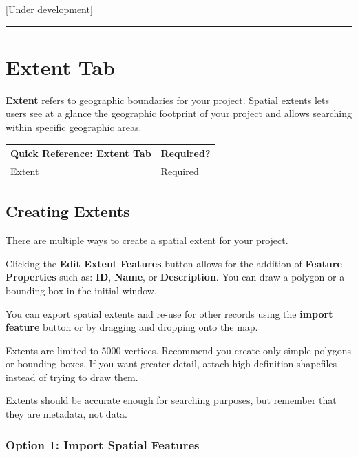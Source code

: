 \documentclass[
]{book}
\begin{document}
{[}Under development{]}

\begin{center}\rule{0.5\linewidth}{\linethickness}\end{center}

\hypertarget{project-extent}{%
\section{Extent Tab}\label{project-extent}}

\textbf{Extent} refers to geographic boundaries for your project. Spatial extents lets users see at a glance the geographic footprint of your project and allows searching within specific geographic areas.

\begin{longtable}[]{@{}ll@{}}
\toprule
Quick Reference: Extent Tab & Required?\tabularnewline
\midrule
\endhead
Extent & Required\tabularnewline
\bottomrule
\end{longtable}

\hypertarget{creating-extents}{%
\subsection{Creating Extents}\label{creating-extents}}

There are multiple ways to create a spatial extent for your project.

Clicking the \textbf{Edit Extent Features} button allows for the addition of \textbf{Feature Properties} such as: \textbf{ID}, \textbf{Name}, or \textbf{Description}. You can draw a polygon or a bounding box in the initial window.

You can export spatial extents and re-use for other records using the \textbf{import feature} button or by dragging and dropping onto the map.

Extents are limited to 5000 vertices. Recommend you create only simple polygons or bounding boxes. If you want greater detail, attach high-definition shapefiles instead of trying to draw them.

Extents should be accurate enough for searching purposes, but remember that they are metadata, not data.

\hypertarget{option-1-import-spatial-features}{%
\subsubsection{Option 1: Import Spatial Features}\label{option-1-import-spatial-features}}
\end{document}
